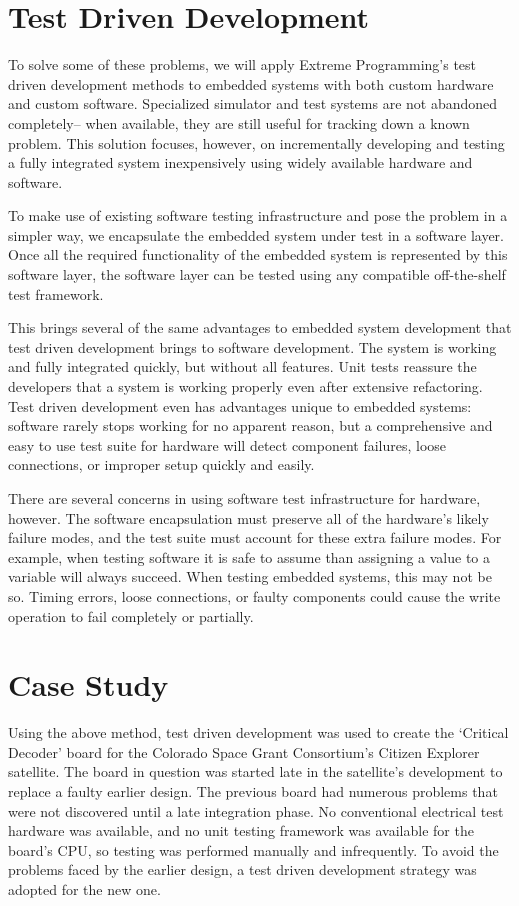 \documentclass[letterpaper]{article}
\begin{document}
\section{Test Driven Development}

To solve some of these problems, we will apply Extreme Programming's test driven development methods
to embedded systems with both custom hardware and custom software. Specialized simulator and
test systems are not abandoned completely-- when available, they are still useful for tracking down
a known problem. This solution focuses, however, on incrementally developing and testing a fully
integrated system inexpensively using widely available hardware and software.

To make use of existing software testing infrastructure and pose the problem in a simpler way,
we encapsulate the embedded system under test in a software layer. Once all the required
functionality of the embedded system is represented by this software layer, the software layer
can be tested using any compatible off-the-shelf test framework.

This brings several of the same advantages to embedded system development that test driven development
brings to software development. The system is working and fully integrated quickly, but without all
features. Unit tests reassure the developers that a system is working properly even after extensive
refactoring. Test driven development even has advantages unique to embedded
systems: software rarely stops working for no apparent reason, but a comprehensive and easy to use
test suite for hardware will detect component failures, loose connections, or improper setup
quickly and easily.

There are several concerns in using software test infrastructure for hardware, however. The software
encapsulation must preserve all of the hardware's likely failure modes, and the test suite must
account for these extra failure modes. For example, when testing software it is safe to assume
than assigning a value to a variable will always succeed. When testing embedded systems, this
may not be so. Timing errors, loose connections, or faulty components could cause the write operation
to fail completely or partially.

\section{Case Study}

Using the above method, test driven development was used to create the `Critical Decoder' board for
the Colorado Space Grant Consortium's Citizen Explorer satellite. The board in question was started
late in the satellite's development to replace a faulty earlier design.
The previous board had numerous
problems that were not discovered until a late integration phase. No conventional electrical test hardware
was available, and no unit testing framework was available for the board's CPU, so testing was performed
manually and infrequently. To avoid the problems faced by the earlier design, a test driven development
strategy was adopted for the new one.
\end{document}

